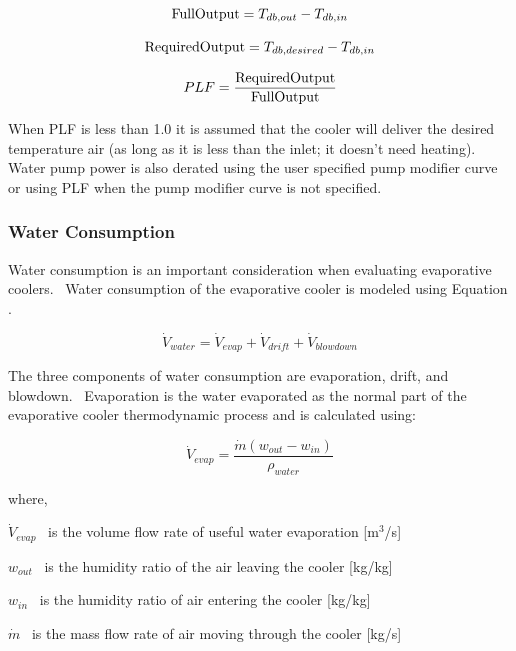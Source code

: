 \begin{equation}
{\rm{FullOutput}} = {T_{db,out}} - {T_{db,in}}
\end{equation}

\begin{equation}
{\rm{RequiredOutput}} = {T_{db,desired}} - {T_{db,in}}
\end{equation}

\begin{equation}
PLF = \frac{{{\rm{RequiredOutput}}}}{{{\rm{FullOutput}}}}
\end{equation}

When PLF is less than 1.0 it is assumed that the cooler will deliver the desired temperature air (as long as it is less than the inlet; it doesn't need heating).~ Water pump power is also derated using the user specified pump modifier curve or using PLF when the pump modifier curve is not specified.

\subsubsection{Water Consumption}\label{water-consumption-1}

Water consumption is an important consideration when evaluating evaporative coolers.~ Water consumption of the evaporative cooler is modeled using Equation .

\begin{equation}
{\dot V_{water}} = {\dot V_{evap}} + {\dot V_{drift}} + {\dot V_{blowdown}}
\end{equation}

The three components of water consumption are evaporation, drift, and blowdown.~ Evaporation is the water evaporated as the normal part of the evaporative cooler thermodynamic process and is calculated using:

\begin{equation}
{\dot V_{evap}} = \frac{{\dot m\left( {{w_{out}} - {w_{in}}} \right)}}{{{\rho_{water}}}}
\end{equation}

where,

\({\dot V_{evap}}\) ~is the volume flow rate of useful water evaporation {[}m\(^{3}\)/s{]}

\({w_{out}}\) ~is the humidity ratio of the air leaving the cooler {[}kg/kg{]}

\({w_{in}}\) ~is the humidity ratio of air entering the cooler {[}kg/kg{]}

\(\dot m\) ~is the mass flow rate of air moving through the cooler {[}kg/s{]}

